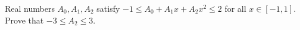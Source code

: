 Real numbers $A_0,A_1,A_2$ satisfy $-1\le A_0+A_1x+A_2x^2\le2$ for all $x\in[-1,1]$. Prove that $-3\le A_2\le3$.
